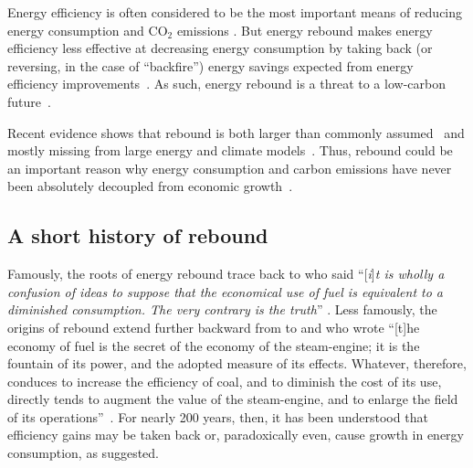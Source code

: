 \documentclass[12pt]{article}\usepackage[]{graphicx}\usepackage[]{xcolor}
\begin{document}
Energy efficiency is often considered to be
the most important means of reducing energy consumption
and CO$_2$ emissions \citep[Fig.~3.15, p.~139]{International-Energy-Agency:2017b}.
But energy rebound makes energy efficiency less effective
at decreasing energy consumption 
by taking back (or reversing, in the case of ``backfire'') 
energy savings expected from energy efficiency improvements~\citep{Sorrell:2009cg}.
As such, energy rebound is a threat to
a low-carbon future~\citep{van-den-Bergh:2017aa, Brockway:2017a}.

Recent evidence shows that rebound is both 
larger than commonly assumed~\citep{Stern2020} and
mostly missing from large energy and climate models~\citep{Brockway:2021ww}.
Thus, rebound could be an important reason why
energy consumption and carbon emissions 
have never been absolutely decoupled 
from economic growth~\citep{Haberl:2020tf, Brockway:2021ww}.


\subsection{A short history of rebound}
\label{sec:short_history}

Famously, the roots of energy rebound trace back to 
\citeauthor{Jevons:1865} who said 
``[\emph{i}]\emph{t is wholly a confusion of ideas to suppose that the economical 
use of fuel is equivalent to a diminished consumption. 
The very contrary is the truth}'' \citep[p.~103, emphasis in original]{Jevons:1865}.
Less famously, the origins of rebound extend further backward 
from \citeauthor{Jevons:1865}
to \citet{Williams1840} and \citeauthor{Parkes1838} who wrote
``[t]he economy of fuel is the secret of the economy of the steam-engine; 
it is the fountain of its power, and the adopted measure of its effects. 
Whatever, therefore, conduces to increase the efficiency of coal, 
and to diminish the cost of its use, 
directly tends to augment the value of the steam-engine, 
and to enlarge the field of its operations''~\citep[p.~161]{Parkes1838}.
For nearly 200 years, then, it has been understood 
that efficiency gains may be taken back or, paradoxically even, 
cause growth in energy consumption,
as \citeauthor{Jevons:1865} suggested.
\end{document}
